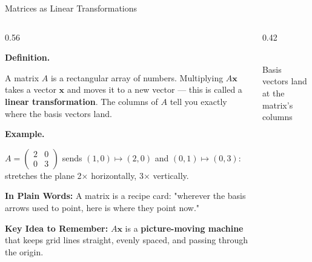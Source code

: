 \documentclass[9pt,aspectratio=169]{beamer}
\newcommand{\keyidea}[1]{%
\par\medskip\noindent\textbf{Key Idea to Remember:} #1\par\medskip}
\newcommand{\childex}[1]{%
\par\medskip\noindent\textbf{In Plain Words:} #1\par\medskip}
\begin{document}
\begin{frame}{Matrices as Linear Transformations}
\footnotesize
\begin{columns}[T]
\begin{column}{0.56\textwidth}
\par\noindent\textbf{Definition.}\par
A matrix $A$ is a rectangular array of numbers. Multiplying $A\mathbf{x}$ takes a vector
$\mathbf{x}$ and moves it to a new vector --- this is called a \textbf{linear
transformation}. The columns of $A$ tell you exactly where the basis vectors land.
\medskip

\par\noindent\textbf{Example.}\par
$A = \begin{pmatrix} 2 & 0 \\ 0 & 3 \end{pmatrix}$ sends $(1,0)\mapsto(2,0)$ and
$(0,1)\mapsto(0,3)$: stretches the plane 2$\times$ horizontally, 3$\times$ vertically.
\medskip

\childex{A matrix is a recipe card: "wherever the basis arrows used to point, here is
where they point now."}

\keyidea{$A\mathbf{x}$ is a \textbf{picture-moving machine} that keeps grid lines
straight, evenly spaced, and passing through the origin.}
\end{column}
\begin{column}{0.42\textwidth}
\centering
{}
\\[0.3em]{\scriptsize Basis vectors land at the matrix's columns}
\end{column}
\end{columns}
\end{frame}
\end{document}
